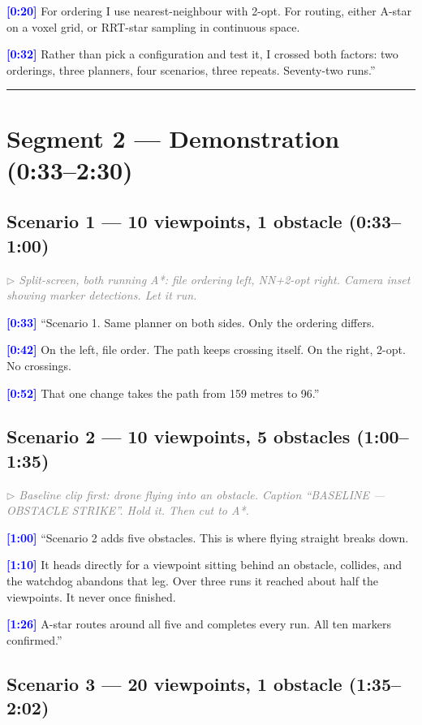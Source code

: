 \documentclass[11pt,a4paper]{article}
\newcommand{\timecode}[1]{\textbf{\textcolor{blue}{[#1]}}}
\newcommand{\cue}[1]{\textit{\textcolor{gray}{$\triangleright$ #1}}}
\begin{document}
\timecode{0:20}
For ordering I use nearest-neighbour with 2-opt. For routing, either A-star on a voxel grid, or RRT-star sampling in continuous space.

\timecode{0:32}
Rather than pick a configuration and test it, I crossed both factors: two orderings, three planners, four scenarios, three repeats. Seventy-two runs.''

\bigskip\hrule\bigskip

\section*{Segment 2 --- Demonstration (0:33--2:30)}

\subsection*{Scenario 1 --- 10 viewpoints, 1 obstacle (0:33--1:00)}

\cue{Split-screen, both running A*: file ordering left, NN+2-opt right. Camera inset showing marker detections. Let it run.}

\timecode{0:33}
``Scenario 1. Same planner on both sides. Only the ordering differs.

\timecode{0:42}
On the left, file order. The path keeps crossing itself. On the right, 2-opt. No crossings.

\timecode{0:52}
That one change takes the path from 159 metres to 96.''

\subsection*{Scenario 2 --- 10 viewpoints, 5 obstacles (1:00--1:35)}

\cue{Baseline clip first: drone flying into an obstacle. Caption ``BASELINE --- OBSTACLE STRIKE''. Hold it. Then cut to A*.}

\timecode{1:00}
``Scenario 2 adds five obstacles. This is where flying straight breaks down.

\timecode{1:10}
It heads directly for a viewpoint sitting behind an obstacle, collides, and the watchdog abandons that leg. Over three runs it reached about half the viewpoints. It never once finished.

\timecode{1:26}
A-star routes around all five and completes every run. All ten markers confirmed.''

\subsection*{Scenario 3 --- 20 viewpoints, 1 obstacle (1:35--2:02)}
\end{document}
